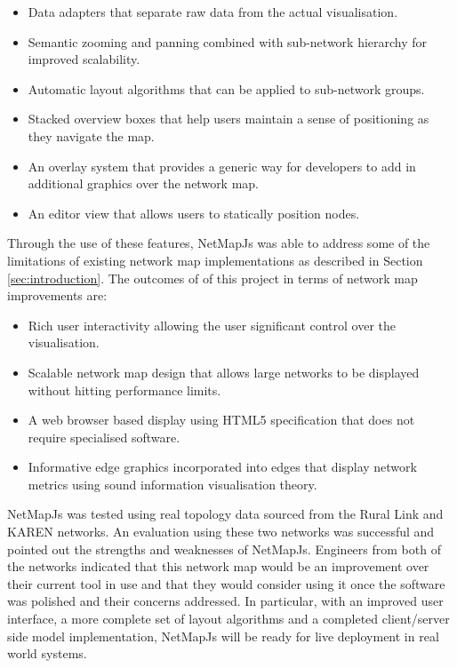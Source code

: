 \documentclass[11pt, a4paper]{report}
\begin{document}
\begin{itemize}
  \item Data adapters that separate raw data from the actual visualisation.
  \item Semantic zooming and panning combined with sub-network hierarchy for
  improved scalability.
  \item Automatic layout algorithms that can be applied to sub-network groups.
  \item Stacked overview boxes that help users maintain a sense of positioning
  as they navigate the map.
  \item An overlay system that provides a generic way for developers to add in
  additional graphics over the network map.
  \item An editor view that allows users to statically position nodes.
\end{itemize}

Through the use of these features, NetMapJs was able to address some of the
limitations of existing network map implementations as described in Section
\ref{sec:introduction}. The outcomes of of this project in terms of network map
improvements are:

\begin{itemize}
  \item Rich user interactivity allowing the user significant control over the
  visualisation.
  \item Scalable network map design that allows large networks to be displayed
  without hitting performance limits.
  \item A web browser based display using HTML5 specification that does not 
  require specialised software.
  \item Informative edge graphics incorporated into edges that display
  network metrics using sound information visualisation theory.
\end{itemize}

NetMapJs was tested using real topology data sourced from the Rural Link and
KAREN networks. An evaluation using these two networks was successful and pointed
out the strengths and weaknesses of NetMapJs. Engineers from both of the
networks indicated that this network map would be an improvement over their
current tool in use and that they would consider using it once the software was
polished and their concerns addressed. In particular, with an improved user
interface, a more complete set of layout algorithms and a completed
client/server side model implementation, NetMapJs will be ready for live
deployment in real world systems.
\end{document}
